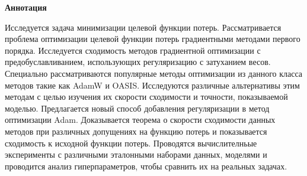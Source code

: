 \begin{center}
    \Large{\textbf{Аннотация}}
\end{center}

Исследуется задача минимизации целевой функции потерь. Рассматривается проблема оптимизации целевой функции потерь градиентными методами первого порядка. Исследуется сходимость методов градиентной оптимизации с предобуславливанием, использующих регуляризацию с затуханием весов. 
Специально рассматриваются популярные методы оптимизации из данного класса методов такие как AdamW и OASIS.
Исследуются различные альтернативы этим методам с целью изучения их скорости сходимости и точности, показываемой моделью.
Предлагается новый способ добавления регуляризации в метод оптимизации Adam. 
Доказывается теорема о скорости сходимости данных методов при различных допущениях на функцию потерь и показывается сходимость к исходной функции потерь.
Проводятся вычислителньые эксперименты с различными эталонными наборами данных, моделями и проводится анализ гиперпараметров, чтобы сравнить их на реальных задачах.